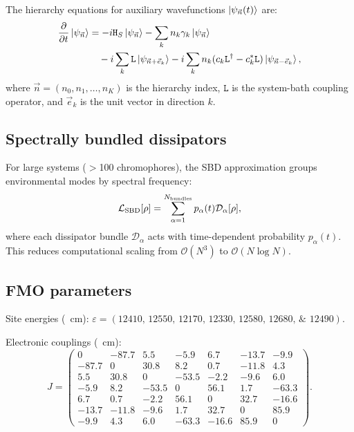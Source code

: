 \documentclass[11pt,a4paper]{article}
\begin{document}
The hierarchy equations for auxiliary wavefunctions $\ket{\psi_{\vec{n}}(t)}$ are:
\begin{align}
\pdv{t}\ket{\psi_{\vec{n}}} &= -i\mathtt{H}_S\ket{\psi_{\vec{n}}} - \sum_k n_k \gamma_k \ket{\psi_{\vec{n}}} \nonumber \\
&\quad - i\sum_k \mathtt{L} \ket{\psi_{\vec{n}+\vec{e}_k}} - i\sum_k n_k (c_k \mathtt{L}^\dagger - c_k^* \mathtt{L}) \ket{\psi_{\vec{n}-\vec{e}_k}},
\end{align}
where $\vec{n} = (n_0, n_1, \dots, n_K)$ is the hierarchy index, $\mathtt{L}$ is the system-bath coupling operator, and $\vec{e}_k$ is the unit vector in direction $k$.

\subsection{Spectrally bundled dissipators}

For large systems ($>$\num{100} chromophores), the SBD approximation groups environmental modes by spectral frequency:
\begin{equation}
\mathcal{L}_{\rm SBD}[\rho] = \sum_{\alpha=1}^{N_{\rm bundles}} p_\alpha(t) \mathcal{D}_\alpha[\rho],
\end{equation}
where each dissipator bundle $\mathcal{D}_\alpha$ acts with time-dependent probability $p_\alpha(t)$. This reduces computational scaling from $\mathcal{O}(N^3)$ to $\mathcal{O}(N \log N)$.

\subsection{FMO parameters}

Site energies (\si{\per\centi\meter}): $\varepsilon = (\numlist{12410; 12550; 12170; 12330; 12580; 12680; 12490})$.

Electronic couplings (\si{\per\centi\meter}):
\begin{equation}
J = \begin{pmatrix}
0 & -87.7 & 5.5 & -5.9 & 6.7 & -13.7 & -9.9 \\
-87.7 & 0 & 30.8 & 8.2 & 0.7 & -11.8 & 4.3 \\
5.5 & 30.8 & 0 & -53.5 & -2.2 & -9.6 & 6.0 \\
-5.9 & 8.2 & -53.5 & 0 & 56.1 & 1.7 & -63.3 \\
6.7 & 0.7 & -2.2 & 56.1 & 0 & 32.7 & -16.6 \\
-13.7 & -11.8 & -9.6 & 1.7 & 32.7 & 0 & 85.9 \\
-9.9 & 4.3 & 6.0 & -63.3 & -16.6 & 85.9 & 0
\end{pmatrix}.
\end{equation}
\end{document}
